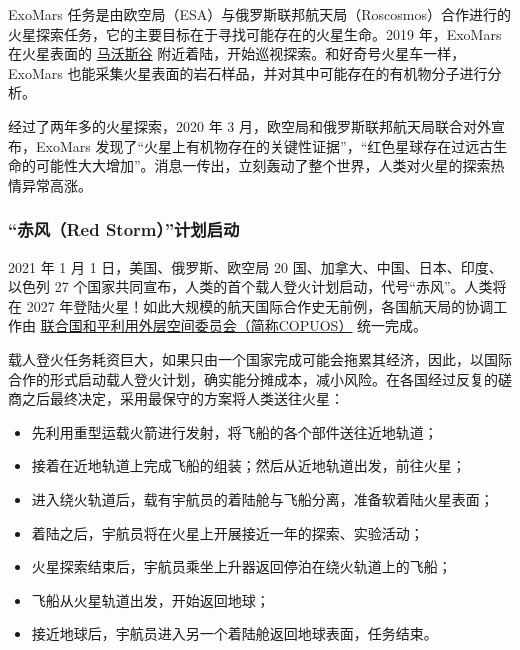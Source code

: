 \documentclass[letterpaper,10pt]{sphinxmanual}
\begin{document}
ExoMars 任务是由欧空局（ESA）与俄罗斯联邦航天局（Roscosmos）合作进行的火星探索任务，它的主要目标在于寻找可能存在的火星生命。2019 年，ExoMars 在火星表面的 \href{http://en.wikipedia.org/wiki/Mawrth\_Vallis}{马沃斯谷} 附近着陆，开始巡视探索。和好奇号火星车一样，ExoMars 也能采集火星表面的岩石样品，并对其中可能存在的有机物分子进行分析。
\begin{figure}[htbp]
\centering
\end{figure}

经过了两年多的火星探索，2020 年 3 月，欧空局和俄罗斯联邦航天局联合对外宣布，ExoMars 发现了“火星上有机物存在的关键性证据”，“红色星球存在过远古生命的可能性大大增加”。消息一传出，立刻轰动了整个世界，人类对火星的探索热情异常高涨。


\subsubsection{“赤风（Red Storm）”计划启动}
\label{history:red-storm}\label{history:index-1}
2021 年 1 月 1 日，美国、俄罗斯、欧空局 20 国、加拿大、中国、日本、印度、以色列 27 个国家共同宣布，人类的首个载人登火计划启动，代号“赤风”。人类将在 2027 年登陆火星！如此大规模的航天国际合作史无前例，各国航天局的协调工作由 \href{http://en.wikipedia.org/wiki/United\_Nations\_Committee\_on\_the\_Peaceful\_Uses\_of\_Outer\_Space}{联合国和平利用外层空间委员会（简称COPUOS）} 统一完成。

载人登火任务耗资巨大，如果只由一个国家完成可能会拖累其经济，因此，以国际合作的形式启动载人登火计划，确实能分摊成本，减小风险。在各国经过反复的磋商之后最终决定，采用最保守的方案将人类送往火星：
\begin{itemize}
\item {} 
先利用重型运载火箭进行发射，将飞船的各个部件送往近地轨道；

\item {} 
接着在近地轨道上完成飞船的组装；然后从近地轨道出发，前往火星；

\item {} 
进入绕火轨道后，载有宇航员的着陆舱与飞船分离，准备软着陆火星表面；

\item {} 
着陆之后，宇航员将在火星上开展接近一年的探索、实验活动；

\item {} 
火星探索结束后，宇航员乘坐上升器返回停泊在绕火轨道上的飞船；

\item {} 
飞船从火星轨道出发，开始返回地球；

\item {} 
接近地球后，宇航员进入另一个着陆舱返回地球表面，任务结束。

\end{itemize}
\end{document}
